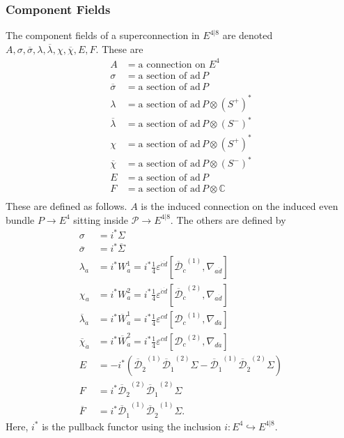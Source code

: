 \documentclass[twoside]{amsart}
\newcommand{\CC}{\ensuremath{\mathbb{C}}}
\renewcommand{\epsilon}{\varepsilon}
\newcommand{\enm}[1]{\ensuremath{#1}}
\newcommand{\superijk}[3]{\enm{{#1}^{#2|#3}}}
\newcommand{\rrij}[2]{\superijk{E}{#1}{#2}}
\renewcommand{\bar}[1]{\overline{#1}}
\newcommand{\onetwoij}[2]{\enm{#1^{(#2)}}}
\newcommand{\one}[1]{\onetwoij{#1}{1}}
\newcommand{\two}[1]{\onetwoij{#1}{2}}
\newcommand{\pp}{\enm{\mathcal{P}}}
\newcommand{\dievencov}[2]{\enm{\nabla_{#1\dot{#2}}}}
\newcommand{\odicov}[1]{\enm{\mathcal{D}_{#1}}}
\newcommand{\odicjcov}[1]{\enm{\bar{\mathcal{D}}_{\dot{#1}}}}
\newcommand{\ad}{\enm{\mathrm{ad}}}
\newcommand{\odijcov}[2]{\onetwoij{\odicov{#2}}{#1}}
\newcommand{\odijcjcov}[2]{\onetwoij{\odicjcov{#2}}{#1}}
\newcommand{\spl}{\enm{S^{+}}}
\newcommand{\sm}{\enm{S^{-}}}
\newcommand{\spd}{\enm{(\spl)^{*}}}
\newcommand{\smd}{\enm{(\sm)^{*}}}
\newcommand{\eps}{\enm{\epsilon}}
\renewcommand{\epsilon}{\varepsilon}
\newcommand{\adp}{\enm{\ad\,P}}
\begin{document}
\subsubsection{Component Fields}
The component fields of a superconnection in \rrij{4}{8} are denoted
\( A, \sigma, \overline{\sigma},
\lambda, \overline{\lambda}, \chi,
\overline{\chi}, E, F. \) These are
\begin{equation}
    \begin{split}
        A                  &= \text{a connection on } E^{4} \\
        \sigma             &= \text{a section of }  \adp  \\
        \overline{\sigma}  &= \text{a section of }  \adp  \\
        \lambda            &= \text{a section of }  \adp\otimes\spd  \\
        \overline{\lambda} &= \text{a section of }  \adp\otimes\smd  \\
        \chi               &= \text{a section of } \adp\otimes\spd  \\
        \overline{\chi}    &= \text{a section of }  \adp\otimes\smd  \\
        E                  &= \text{a section of }  \adp  \\
        F                  &= \text{a section of }  \adp\otimes\CC  \\
    \end{split}
    \label{eq:defofcomponentsinr48}
\end{equation}
These are defined as follows.  \( A \) is the induced connection on
the induced even bundle \( P\to E^{4} \) sitting inside \(
\pp\to\rrij{4}{8}. \)  The others are defined by
\begin{align}
    \sigma &= i^{*}\Sigma\nonumber \\
    \bar{\sigma} &= i^{*}\bar{\Sigma}\nonumber \\
    \lambda_{a} &= i^{*} W^{1}_{a} = i^{*}
     \frac{1}{4}\eps^{\dot{c}\dot{d}} [\odijcjcov{1}{c},
\dievencov{a}{d}]
     \nonumber\\
    \chi_{a} &= i^{*} W^{2}_{a} = i^{*}
     \frac{1}{4}\eps^{\dot{c}\dot{d}} [\odijcjcov{2}{c},
     \dievencov{a}{d}]\nonumber \\
    \overline{\lambda}_{\dot{a}} &= i^{*} \overline{W}^{1}_{\dot{a}}
= i^{*}
     \frac{1}{4}\eps^{cd} [\odijcov{1}{c},
     \dievencov{d}{a}]\label{eq:defofcomponentsinr482} \\
    \overline{\chi}_{\dot{a}} &= i^{*} \overline{W}^{2}_{\dot{a}} =
i^{*}
     \frac{1}{4}\eps^{cd} [\odijcov{2}{c}, \dievencov{d}{a}]
\nonumber\\
    E &=  -i^{*}(\one{\odicjcov{2}}
     \two{\odicjcov{1}}\Sigma - \one{\odicjcov{1}}
     \two{\odicjcov{2}}\Sigma)\nonumber \\
    F &= i^{*}\two{\odicjcov{2}}\two{\odicjcov{1}}
     \Sigma\nonumber \\
    \bar{F} &= i^{*}\one{\odicjcov{1}}\one{\odicjcov{2}}
     \Sigma\nonumber.
 \end{align}
Here, \( i^* \) is the pullback functor using the inclusion \(
i:E^4\hookrightarrow \rrij{4}{8}. \)
\end{document}
